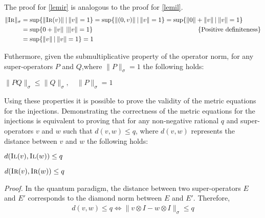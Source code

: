 The proof for \autoref{lemir} is analogous to the proof for \autoref{lemil}.
\begin{equation} 
  \begin{split}
    \lVert \textsc{Ir} \rVert_{\sigma} &= \text{sup} \{\lVert \textsc{Ir} (v) \rVert \hspace{2pt} \vert \hspace{2pt}  \lVert v\rVert =1 \} = \text{sup} \{\lVert (0,v) \rVert \hspace{2pt} \vert \hspace{2pt}  \lVert v\rVert =1 \} = \text{sup} \{ \lVert 0 \rVert +\lVert v \rVert   \hspace{2pt} \vert \hspace{2pt}  \lVert v\rVert =1 \} \\
    & = \text{sup} \{0+\lVert v \rVert \hspace{2pt}     \hspace{2pt}  \vert \lVert v\rVert =1 \} \hspace{160 pt} \text{ \{Positive definiteness\}} \\
    & = \text{sup} \{\lVert v \rVert \hspace{2pt} \vert \hspace{2pt}  \lVert v\rVert =1 \} = 1
  \end{split}
  \end{equation}

Futhermore, given the submultiplicative property of the operator norm, for any super-operators $P$ and $Q$,where $\lVert P \rVert_{\sigma} =1  $ the following holds:
\begin{lemma}\label{lemleq}
  $\lVert PQ \rVert_{\sigma} \leq  \lVert Q \rVert_{\sigma}, \quad \lVert P \rVert_{\sigma}  =1 $ 
\end{lemma}

Using these properties it is possible to prove the validity of the metric equations for the injections. Demonstrating the correctness of the metric equations for the injections is equivalent to proving that for any  non‑negative rational $q$ and super-operators $v$ and $w$ such that $d(v,w) \leq q$, where  $d(v,w)$ represents the distance between $v$ and $w$ the following holds:

\begin{theorem} \label{theoremil}
  $d(\textsc{Il}(v),\textsc{Il} (w)) \leq q$
\end{theorem}
\begin{theorem} \label{theoremir}
  $d(\textsc{Ir}(v),\textsc{Ir} (w)) \leq q$
\end{theorem}
\vspace{10pt}
\textit{Proof.} \quad In the quantum paradigm, the distance between two super-operators $E$ and $E'$ corresponds to the diamond norm between $E$ and $E'$. Therefore,
\begin{equation}
\begin{split}
  d(v,w) \leq q \Leftrightarrow \lVert v \otimes I - w \otimes I \rVert_{\sigma} \leq q
\end{split}
\end{equation}

